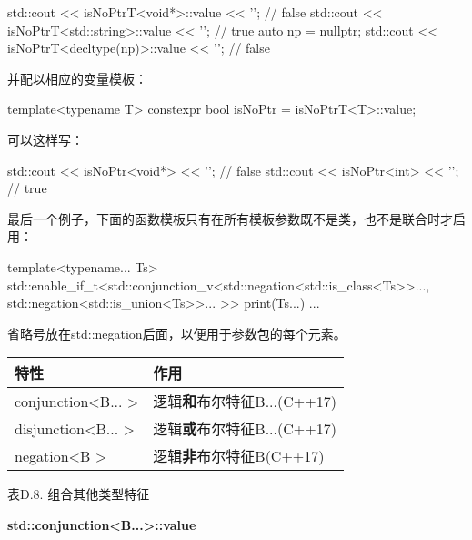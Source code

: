 \begin{cpp}
std::cout << isNoPtrT<void*>::value << '\n'; // false
std::cout << isNoPtrT<std::string>::value << '\n'; // true
auto np = nullptr;
std::cout << isNoPtrT<decltype(np)>::value << '\n'; // false
\end{cpp}

并配以相应的变量模板：

\begin{cpp}
template<typename T>
constexpr bool isNoPtr = isNoPtrT<T>::value;
\end{cpp}

可以这样写：

\begin{cpp}
std::cout << isNoPtr<void*> << '\n'; // false
std::cout << isNoPtr<int> << '\n'; // true
\end{cpp}

最后一个例子，下面的函数模板只有在所有模板参数既不是类，也不是联合时才启用：

\begin{cpp}
template<typename... Ts>
std::enable_if_t<std::conjunction_v<std::negation<std::is_class<Ts>>...,
									std::negation<std::is_union<Ts>>...
									>>
print(Ts...)
{
	...
}
\end{cpp}

省略号放在std::negation后面，以便用于参数包的每个元素。

\begin{table}[H]
	\begin{center}
	\begin{tabular}{l|l}
		\hline
		\textbf{特性}                            & \textbf{作用}                                   \\ \hline
		conjunction\textless{}B... \textgreater{} & 逻辑\textbf{和}布尔特征B...(C++17) \\ \hline
		disjunction\textless{}B... \textgreater{} & 逻辑\textbf{或}布尔特征B...(C++17)  \\ \hline
		negation\textless{}B \textgreater{}       & 逻辑\textbf{非}布尔特征B(C++17)     \\ \hline
	\end{tabular}
	\end{center}
\end{table}

\begin{center}
表D.8. 组合其他类型特征
\end{center}

\textbf{std::conjunction<B...>::value}

